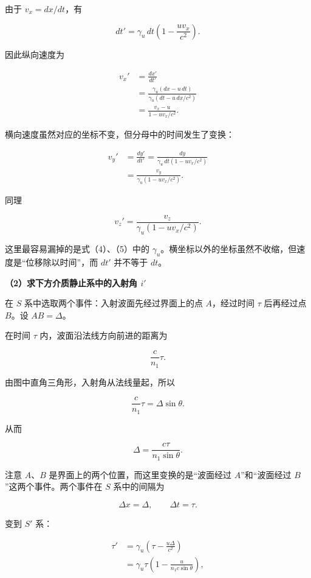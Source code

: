 \documentclass[12pt,a4paper,UTF8]{ctexart}
\begin{document}
由于 \(v_x=dx/dt\)，有

\[
dt'=\gamma_u\,dt\left(1-\frac{uv_x}{c^2}\right).
\]

因此纵向速度为

\[
\begin{aligned}
v_x'
&=\frac{dx'}{dt'}\\
&=\frac{\gamma_u(dx-u\,dt)}
{\gamma_u\left(dt-u\,dx/c^2\right)}\\
&=\boxed{\frac{v_x-u}{1-uv_x/c^2}}.
\end{aligned}\tag{3}
\]

横向速度虽然对应的坐标不变，但分母中的时间发生了变换：

\[
\begin{aligned}
v_y'
&=\frac{dy'}{dt'}
=\frac{dy}{\gamma_u\,dt(1-uv_x/c^2)}\\
&=\boxed{\frac{v_y}{\gamma_u(1-uv_x/c^2)}}.
\end{aligned}\tag{4}
\]

同理

\[
\boxed{
v_z'=\frac{v_z}{\gamma_u(1-uv_x/c^2)}
}.
\tag{5}
\]

这里最容易漏掉的是式（4）、（5）中的
\(\gamma_u\)。横坐标以外的坐标虽然不收缩，但速度是``位移除以时间''，而
\(dt'\) 并不等于 \(dt\)。

\textbf{（2）求下方介质静止系中的入射角 \(i'\)}

在 \(S\) 系中选取两个事件：入射波面先经过界面上的点 \(A\)，经过时间
\(\tau\) 后再经过点 \(B\)。设 \(AB=\Delta\)。

在时间 \(\tau\) 内，波面沿法线方向前进的距离为

\[
\frac{c}{n_1}\tau.
\]

由图中直角三角形，入射角从法线量起，所以

\[
\frac{c}{n_1}\tau=\Delta\sin\theta.
\]

从而

\[
\boxed{
\Delta=\frac{c\tau}{n_1\sin\theta}
}.
\tag{6}
\]

注意 \(A\)、\(B\) 是界面上的两个位置，而这里变换的是``波面经过
\(A\)''和``波面经过 \(B\)''这两个事件。两个事件在 \(S\) 系中的间隔为

\[
\Delta x=\Delta,\qquad \Delta t=\tau.
\]

变到 \(S'\) 系：

\[
\begin{aligned}
\tau'
&=\gamma_u\left(\tau-\frac{u\Delta}{c^2}\right)\\
&=\gamma_u\tau\left(1-
\frac{u}{n_1c\sin\theta}\right),
\end{aligned}\tag{7}
\]
\end{document}
